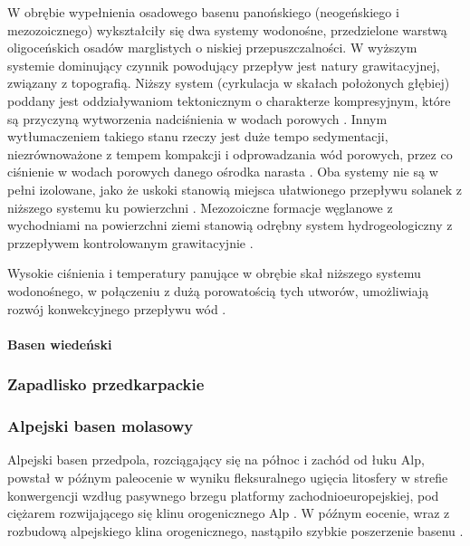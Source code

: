 \documentclass[11.5pt,twoside]{report}
\begin{document}
 W obrębie wypełnienia osadowego basenu panońskiego (neogeńskiego i mezozoicznego) wykształciły się dwa systemy wodonośne, przedzielone warstwą oligoceńskich osadów marglistych o niskiej przepuszczalności. W wyższym systemie dominujący czynnik powodujący przepływ jest natury grawitacyjnej, związany z topografią. Niższy system (cyrkulacja w skałach położonych głębiej) poddany jest oddziaływaniom tektonicznym o charakterze kompresyjnym, które są przyczyną wytworzenia nadciśnienia w wodach porowych \parencite{Toth.2001}. Innym wytłumaczeniem takiego stanu rzeczy jest duże tempo sedymentacji, niezrównoważone z tempem kompakcji i odprowadzania wód porowych, przez co ciśnienie w wodach porowych danego ośrodka narasta \parencite{Horvath.2015}. Oba systemy nie są w pełni izolowane, jako że uskoki stanowią miejsca ułatwionego przepływu solanek z niższego systemu ku powierzchni \parencite{Toth.2001}. Mezozoiczne formacje węglanowe z wychodniami na powierzchni ziemi stanowią odrębny system hydrogeologiczny z przzepływem kontrolowanym grawitacyjnie \parencite{Horvath.2015}. 
 
 Wysokie ciśnienia i temperatury panujące w obrębie skał niższego systemu wodonośnego, w połączeniu z dużą porowatością tych utworów, umożliwiają rozwój konwekcyjnego przepływu wód \parencite{Horvath.2015}.
 
 
	\paragraph{Basen wiedeński}
	
 
 \subsubsection{Zapadlisko przedkarpackie}
 
 \subsubsection{Alpejski basen molasowy}
 
 Alpejski basen przedpola, rozciągający się na północ i zachód od łuku Alp, powstał w pó\'{z}nym paleocenie w wyniku fleksuralnego ugięcia litosfery w strefie konwergencji wzdług pasywnego brzegu platformy zachodnioeuropejskiej, pod ciężarem rozwijającego się klinu orogenicznego Alp \parencite{Sissingh.2006a}. W pó\'{z}nym eocenie, wraz z rozbudową alpejskiego klina orogenicznego, nastąpiło szybkie poszerzenie basenu \parencite{Dezes.2004}.
 
\end{document}
